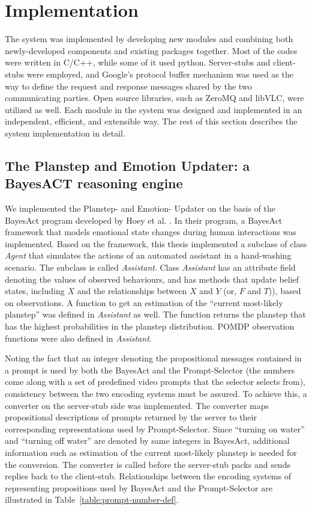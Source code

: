 \chapter{Implementation}
\label{chap:impl}

The system was implemented by developing new modules and combining both newly-developed components and existing packages together. Most of the codes were written in C/C++, while some of it used python. Server-stubs and client-stubs were employed, and Google's protocol buffer mechanism was used as the way to define the request and response messages shared by the two communicating parties. Open source libraries, such as ZeroMQ and libVLC, were utilized as well. Each module in the system was designed and implemented in an independent, efficient, and extensible way. The rest of this section describes the system implementation in detail.

\section{The Planstep and Emotion Updater: a BayesACT reasoning engine}

We implemented the Planstep- and Emotion- Updater on the basis of the BayesAct program developed by Hoey et al. \cite{hoey2013bayesian}. In their program, a BayesAct framework that models emotional state changes during human interactions was implemented. Based on the framework, this thesis implemented a subclass of class \textit{Agent} that simulates the actions of an automated assistant in a hand-washing scenario. The subclass is called \textit{Assistant}. Class \textit{Assistant} has an attribute field denoting the values of observed behaviours, and has methods that update belief states, including $X$ and the relationships between $X$ and $Y$ (or, $F$ and $T$)), based on observations. A function to get an estimation of the ``current most-likely planstep'' was defined in \textit{Assistant} as well. The function returns the planstep that has the highest probabilities in the planstep distribution. POMDP observation functions were also defined in \textit{Assistant}. 

Noting the fact that an integer denoting the propositional messages contained in a prompt is used by both the BayesAct and the Prompt-Selector (the numbers come along with a set of predefined video prompts that the selector selects from), consistency between the two encoding systems must be assured. To achieve this, a converter on the server-stub side was implemented. The converter maps propositional descriptions of prompts returned by the server to their corresponding representations used by Prompt-Selector. Since ``turning on water'' and ``turning off water'' are denoted by same integers in BayesAct, additional information such as estimation of the current most-likely planstep is needed for the conversion. The converter is called before the server-stub packs and sends replies back to the client-stub. Relationships between the encoding systems of representing propositions used by BayesAct and the Prompt-Selector are illustrated in Table~\ref{table:prompt-number-def}.

